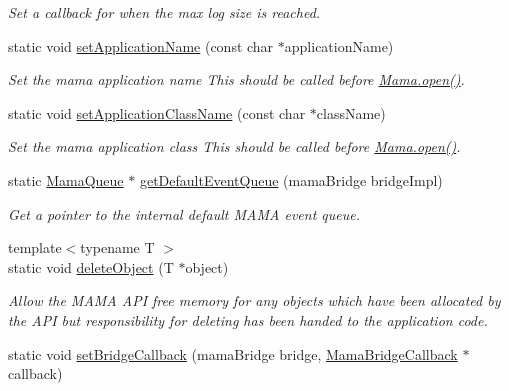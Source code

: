 \begin{DoxyCompactItemize}
\begin{DoxyCompactList}\small\item\em Set a callback for when the max log size is reached. \item\end{DoxyCompactList}\item 
static void \hyperlink{classWombat_1_1Mama_aa300e6f36cc4f9efb6099550a5657149}{setApplicationName} (const char $\ast$applicationName)
\begin{DoxyCompactList}\small\item\em Set the mama application name This should be called before \hyperlink{classWombat_1_1Mama_af1fafa88e6e22e7afc37b10de0f5a0d5}{Mama.open()}. \item\end{DoxyCompactList}\item 
static void \hyperlink{classWombat_1_1Mama_ac964c759a0d0e1be140bb0aa4930e34f}{setApplicationClassName} (const char $\ast$className)
\begin{DoxyCompactList}\small\item\em Set the mama application class This should be called before \hyperlink{classWombat_1_1Mama_af1fafa88e6e22e7afc37b10de0f5a0d5}{Mama.open()}. \item\end{DoxyCompactList}\item 
static \hyperlink{classWombat_1_1MamaQueue}{MamaQueue} $\ast$ \hyperlink{classWombat_1_1Mama_a3f69282b2ccf02d2ae0d1ed6f414c627}{getDefaultEventQueue} (mamaBridge bridgeImpl)
\begin{DoxyCompactList}\small\item\em Get a pointer to the internal default MAMA event queue. \item\end{DoxyCompactList}\item 
{\footnotesize template$<$typename T $>$ }\\static void \hyperlink{classWombat_1_1Mama_a0ff6fa37b52def9d40b1174b94f76800}{deleteObject} (T $\ast$object)
\begin{DoxyCompactList}\small\item\em Allow the MAMA API free memory for any objects which have been allocated by the API but responsibility for deleting has been handed to the application code. \item\end{DoxyCompactList}\item 
static void \hyperlink{classWombat_1_1Mama_ae483353a450b19b32b5b52d49e870d3c}{setBridgeCallback} (mamaBridge bridge, \hyperlink{classWombat_1_1MamaBridgeCallback}{MamaBridgeCallback} $\ast$callback)

\end{DoxyCompactItemize}
